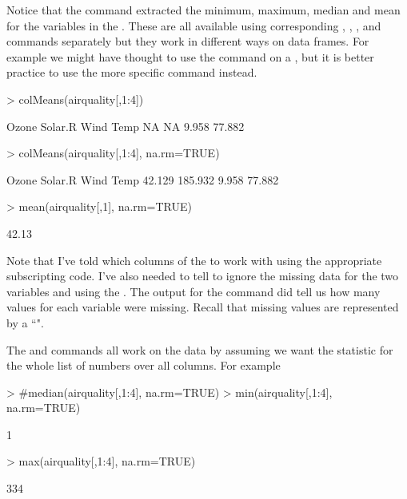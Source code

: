 Notice that the  command extracted the minimum, maximum, median and mean for the variables in the . These are all available using corresponding , , , and  commands separately but they work in different ways on data frames. For example we might have thought to use the  command on a , but it is better practice to use the more specific  command instead.
\begin{Schunk}
\begin{Sinput}
> colMeans(airquality[,1:4])
\end{Sinput}
\begin{Soutput}
  Ozone Solar.R    Wind    Temp 
     NA      NA   9.958  77.882 
\end{Soutput}
\begin{Sinput}
> colMeans(airquality[,1:4], na.rm=TRUE)
\end{Sinput}
\begin{Soutput}
  Ozone Solar.R    Wind    Temp 
 42.129 185.932   9.958  77.882 
\end{Soutput}
\begin{Sinput}
> mean(airquality[,1], na.rm=TRUE)
\end{Sinput}
\begin{Soutput}
[1] 42.13
\end{Soutput}
\end{Schunk}
Note that I've told \R{} which columns of the   to work with using the appropriate subscripting code. I've also needed to tell \R{} to ignore the missing data for the two variables  and  using the . The output for the  command did tell us how many values for each variable were missing. Recall that missing values are represented by a ``".

The  and  commands all work on the data by assuming we want the statistic for the whole list of numbers over all columns. For example
\begin{Schunk}
\begin{Sinput}
> #median(airquality[,1:4], na.rm=TRUE)
> min(airquality[,1:4], na.rm=TRUE)
\end{Sinput}
\begin{Soutput}
[1] 1
\end{Soutput}
\begin{Sinput}
> max(airquality[,1:4], na.rm=TRUE)
\end{Sinput}
\begin{Soutput}
[1] 334
\end{Soutput}
\end{Schunk}

